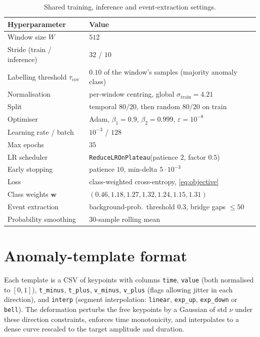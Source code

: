 \begin{table}[H]
    \centering \footnotesize
    \begin{tabular}{ll}
        \toprule
        Hyperparameter & Value \\
        \midrule
        Window size $W$                & $512$ \\
        Stride (train / inference)     & $32$ / $10$ \\
        Labelling threshold $\tau_{\mathrm{cov}}$ & $0.10$ of the window's samples (majority anomaly class) \\
        Normalisation                  & per-window centring, global $\sigma_{\mathrm{train}}=4.21$ \\
        Split                          & temporal $80/20$, then random $80/20$ on train \\
        Optimiser                      & Adam, $\beta_1{=}0.9$, $\beta_2{=}0.999$, $\varepsilon{=}10^{-8}$ \\
        Learning rate / batch          & $10^{-3}$ / $128$ \\
        Max epochs                     & $35$ \\
        LR scheduler                   & \texttt{ReduceLROnPlateau}(patience $2$, factor $0.5$) \\
        Early stopping                 & patience $10$, min-delta $5\cdot10^{-3}$ \\
        Loss                           & class-weighted cross-entropy, \cref{eq:objective} \\
        Class weights $\mathbf{w}$     & $(0.46,1.18,1.27,1.32,1.24,1.15,1.31)$ \\
        \midrule
        Event extraction              & background-prob.\ threshold $0.3$, bridge gaps $\le 50$ \\
        Probability smoothing         & $30$-sample rolling mean \\
        \bottomrule
    \end{tabular}
    \caption{Shared training, inference and event-extraction settings.}
    \label{tab:app-hp}
\end{table}

\section{Anomaly-template format}
\label{app:csv}

Each template is a CSV of keypoints with columns
\texttt{time}, \texttt{value} (both normalised to $[0,1]$),
\texttt{t\_minus}, \texttt{t\_plus}, \texttt{v\_minus}, \texttt{v\_plus}
(flags allowing jitter in each direction), and \texttt{interp}
(segment interpolation: \texttt{linear}, \texttt{exp\_up}, \texttt{exp\_down} or
\texttt{bell}). The deformation perturbs the free keypoints by a Gaussian of
std $\nu$ under these direction constraints, enforces time monotonicity, and
interpolates to a dense curve rescaled to the target amplitude and duration.

